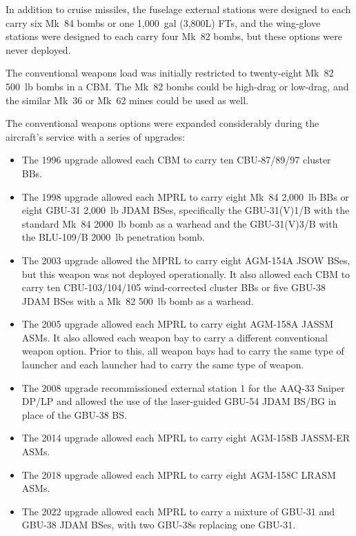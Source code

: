 In addition to cruise missiles, the fuselage external stations were designed to each carry six Mk~84 bombs or one 1,000~gal (3,800L) FTs, and the wing-glove stations were designed to each carry four Mk~82 bombs, but these options were never deployed.

The conventional weapons load was initially restricted to twenty-eight Mk~82 500~lb bombs in a CBM. The Mk~82 bombs could be high-drag or low-drag, and the similar Mk~36 or Mk~62 mines could be used as well.

The conventional weapons options were expanded considerably during the aircraft's service with a series of upgrades:
\begin{itemize}\sloppy

    \item The 1996 upgrade allowed each CBM to carry ten CBU-87/89/97 cluster BBs.

    \item The 1998 upgrade allowed each MPRL to carry eight Mk~84 2,000~lb BBs or eight GBU-31 2,000~lb JDAM BSes, specifically the GBU-31(V)1/B with the standard Mk~84 2000~lb bomb as a warhead and the GBU-31(V)3/B with the BLU-109/B 2000~lb penetration bomb.

    \item The 2003 upgrade allowed the MPRL to carry eight AGM-154A JSOW BSes, but this weapon was not deployed operationally. It also allowed each CBM to carry ten CBU-103/104/105 wind-corrected cluster BBs or five GBU-38 JDAM BSes with a Mk~82 500~lb bomb as a warhead.

    \item The 2005 upgrade allowed each MPRL to carry eight AGM-158A JASSM ASMs. It also allowed each weapon bay to carry a different conventional weapon option. Prior to this, all weapon bays had to carry the same type of launcher and each launcher had to carry the same type of weapon.

    \item The 2008 upgrade recommissioned external station 1 for the AAQ-33 Sniper DP/LP and allowed the use of the laser-guided GBU-54 JDAM BS/BG in place of the GBU-38 BS.

    \item The 2014 upgrade allowed each MPRL to carry eight AGM-158B JASSM-ER ASMs.

    \item The 2018 upgrade allowed each MPRL to carry eight AGM-158C LRASM ASMs.

    \item The 2022 upgrade allowed each MPRL to carry a mixture of GBU-31 and GBU-38 JDAM BSes, with two GBU-38s replacing one GBU-31.

\end{itemize}


